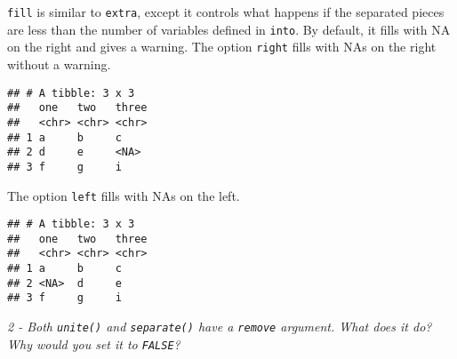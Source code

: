 \documentclass[]{article}
\newenvironment{Shaded}{\begin{snugshade}}{\end{snugshade}}
\newcommand{\KeywordTok}[1]{\textcolor[rgb]{0.13,0.29,0.53}{\textbf{#1}}}
\newcommand{\DataTypeTok}[1]{\textcolor[rgb]{0.13,0.29,0.53}{#1}}
\newcommand{\StringTok}[1]{\textcolor[rgb]{0.31,0.60,0.02}{#1}}
\newcommand{\OperatorTok}[1]{\textcolor[rgb]{0.81,0.36,0.00}{\textbf{#1}}}
\newcommand{\NormalTok}[1]{#1}
\theoremstyle{definition}
\theoremstyle{definition}
\theoremstyle{definition}
\theoremstyle{remark}
\begin{document}
\texttt{fill} is similar to \texttt{extra}, except it controls what
happens if the separated pieces are less than the number of variables
defined in \texttt{into}. By default, it fills with NA on the right and
gives a warning. The option \texttt{right} fills with NAs on the right
without a warning.

\begin{Shaded}
\end{Shaded}

\begin{verbatim}
## # A tibble: 3 x 3
##   one   two   three
##   <chr> <chr> <chr>
## 1 a     b     c    
## 2 d     e     <NA> 
## 3 f     g     i
\end{verbatim}

The option \texttt{left} fills with NAs on the left.

\begin{Shaded}
\end{Shaded}

\begin{verbatim}
## # A tibble: 3 x 3
##   one   two   three
##   <chr> <chr> <chr>
## 1 a     b     c    
## 2 <NA>  d     e    
## 3 f     g     i
\end{verbatim}

\emph{2 - Both \texttt{unite()} and \texttt{separate()} have a
\texttt{remove} argument. What does it do? Why would you set it to
\texttt{FALSE}?}
\end{document}
